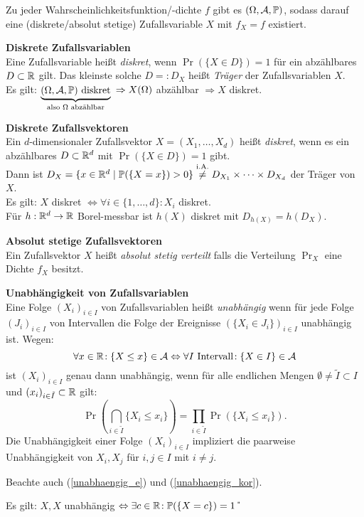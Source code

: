 Zu jeder Wahrscheinlichkeitsfunktion/-dichte $f$ gibt es $(\Omega,\mathcal{A},\mathbb{P})$, sodass
darauf eine (diskrete/absolut stetige) Zufallsvariable $X$ mit
$f_X = f$ existiert.

\textbf{Diskrete Zufallsvariablen}\\
Eine Zufallsvariable heißt \textit{diskret}, wenn $\Pr(\{X \in D\}) = 1$
für ein abzählbares $D\subset\mathbb{R}$ gilt.
Das kleinste solche $D =: D_X$ heißt \textit{Träger} der Zufallsvariablen $X$.\\
Es gilt:
$\underbrace{(\Omega,\mathcal{A},\mathbb{P}) \text{ diskret}}_{\text{also $\Omega$ abzählbar}}$
$\Rightarrow X(\Omega)$ abzählbar $\Rightarrow X$ diskret.

\textbf{Diskrete Zufallsvektoren}\\
Ein $d$-dimensionaler Zufallsvektor $X = (X_1,\ldots,X_d)$ heißt \textit{diskret},
wenn es ein abzählbares $D\subset\mathbb{R}^d$ mit $\Pr(\{X \in D\}) = 1$ gibt.\\
Dann ist $D_X = \{x\in\mathbb{R}^d \mid \mathbb{P}(\{X=x\})>0\}
\overset{\text{i.A.}}{\neq} D_{X_1} \times\cdots\times D_{X_d}$
der Träger von $X$.\\
Es gilt: $X$ diskret $\Leftrightarrow \forall i\in\{1,\ldots,d\}\!: X_i$ diskret.\\
Für $h:\mathbb{R}^d\to\mathbb{R}$ Borel-messbar ist $h(X)$ diskret mit $D_{h(X)} = h(D_X)$.

\textbf{Absolut stetige Zufallsvektoren}\\
Ein Zufallsvektor $X$ heißt \textit{absolut stetig verteilt} falls die
Verteilung $\Pr_X$ eine Dichte $f_X$ besitzt.

\textbf{Unabhängigkeit von Zufallsvariablen}\\
Eine Folge $(X_i)_{i \in I}$ von Zufallsvariablen heißt \textit{unabhängig} wenn
für jede Folge $(J_i)_{i \in I}$ von Intervallen die Folge der Ereignisse
$(\{X_i \in J_i\})_{i \in I}$ unabhängig ist.
Wegen:
\[
  \forall x\in\mathbb{R}\!: \{X \leq x\} \in \mathcal{A}
  \Leftrightarrow \forall I \text{ Intervall}\!: \{X \in I\} \in \mathcal{A}
\]
ist $(X_i)_{i \in I}$ genau dann unabhängig, wenn für alle endlichen Mengen
$\emptyset \neq \tilde{I} \subset I$ und
\mbox{$(x_i)_{i\in\tilde{I}}\subset\mathbb{R}$} gilt:
\[
  \Pr(\bigcap_{i\in\tilde{I}} \{X_i \leq x_i\})=
  \prod_{i\in\tilde{I}} \Pr(\{X_i \leq x_i\}).
\]
Die Unabhängigkeit einer Folge $(X_i)_{i \in I}$ impliziert die paarweise
Unabhängigkeit von $X_i,X_j$ für $i,j \in I$ mit $i \neq j$.

Beachte auch (\ref{unabhaengig_e}) und (\ref{unabhaengig_kor}).

Es gilt: $X,X$ unabhängig $\Leftrightarrow \exists c\in\mathbb{R}\!: \mathbb{P}(\{X=c\}) = 1$ \U

